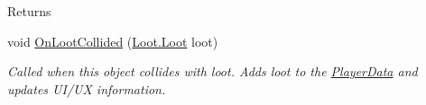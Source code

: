 \begin{DoxyCompactItemize}
\begin{DoxyCompactList}
\begin{DoxyReturn}{Returns}

\end{DoxyReturn}
 \end{DoxyCompactList}\item 
void \hyperlink{class_skyrates_1_1_client_1_1_entity_1_1_entity_player_ship_a276f68d1ca868650ce0cfa6cd1e53a10}{On\-Loot\-Collided} (\hyperlink{class_skyrates_1_1_client_1_1_loot_1_1_loot}{Loot.\-Loot} loot)
\begin{DoxyCompactList}\small\item\em Called when this object collides with loot. Adds loot to the \hyperlink{class_skyrates_1_1_client_1_1_entity_1_1_entity_player_ship_a775f40dd5d6c89a50325eaa9dbd605b8}{Player\-Data} and updates U\-I/\-U\-X information. \end{DoxyCompactList}\end{DoxyCompactItemize}
